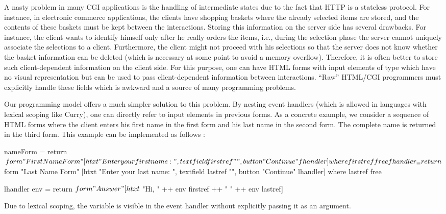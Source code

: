 A nasty problem in many CGI applications is the handling
of intermediate states due to the fact that HTTP is a stateless
protocol. For instance, in electronic commerce applications,
the clients have shopping baskets where
the already selected items are stored, and the contents of
these baskets must be kept between the interactions.
Storing this information on the server side
has several drawbacks. For instance, the client
wants to identify himself only after he really orders
the items, i.e., during the selection phase the server
cannot uniquely associate the selections to a client.
Furthermore, the client might not proceed with his selections
so that the server does not know whether
the basket information can be deleted (which is necessary
at some point to avoid a memory overflow).
Therefore, it is often better to store such client-dependent
information on the client side. For this purpose,
one can have HTML forms with input elements of type 
which have no visual representation but can be used
to pass client-dependent information between interactions.
``Raw'' HTML/CGI programmers must explicitly handle
these fields which is awkward and a source of many
programming problems.

Our programming model offers a much simpler solution
to this problem. By nesting event handlers
(which is allowed in languages with lexical scoping like Curry),
one can directly refer to input elements in previous forms.
As a concrete example, we consider
a sequence of HTML forms where the client enters
his first name in the first form and his last name in the second form.
The complete name is returned in the third form.
This example can be implemented as follows
:
%
\begin{curry}
nameForm = return $ form "First Name Form"
  [htxt "Enter your first name: ", textfield firstref "",
   button "Continue" fhandler]
 where
   firstref free

   fhandler _ = return $ form "Last Name Form"
                  [htxt "Enter your last name: ", textfield lastref "",
                   button "Continue" lhandler]
     where
       lastref free

       lhandler env = return $ form "Answer"
                        [htxt $ "Hi, " ++ env firstref ++ " " ++ env lastref]
\end{curry}
%
Due to lexical scoping, the variable 
is visible in the event handler  without explicitly
passing it as an argument.


